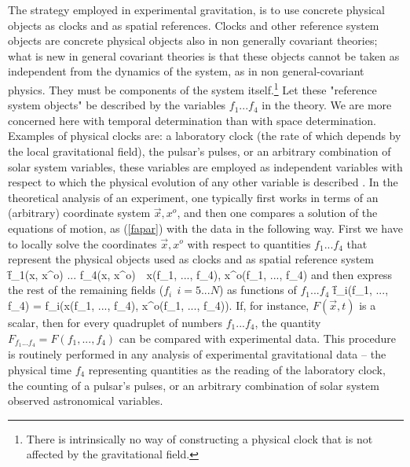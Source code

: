 The strategy employed in experimental gravitation, is to
use concrete physical objects as clocks and as spatial references.
Clocks and other reference system objects are concrete physical
objects also in non generally covariant theories; what is new in
general covariant theories is that these objects cannot be taken
as independent from the dynamics of the system, as in non
general-covariant physics.  They must be components of the
system itself.\footnote{There is intrinsically no way of
constructing a physical clock that is not affected by the
gravitational field.}  Let these "reference system objects" be
described by the variables $f_1... f_4$ in the theory.  We are more
concerned here with temporal determination than with space
determination.  Examples of physical clocks are: a laboratory
clock (the rate of which depends by the local gravitational field),
the pulsar's pulses, or an arbitrary combination of solar system
variables, these variables are employed as independent variables
with respect to which the physical evolution of any other variable
is described  \cite{tradition,observable}.  In the theoretical
analysis of an experiment, one typically first works in terms of
an (arbitrary) coordinate system $\vec x, x^o$, and then one
compares a solution of the equations of motion, as (\ref{fapar})
with the data in the following way.  First we have to locally solve
the coordinates $\vec x, x^o$ with respect to quantities $f_1...
f_4$ that represent the physical objects used as clocks and as
spatial reference system
_1(\vec x, x^o) ... f_4(\vec x, x^o)\  \rightarrow \
	\vec x(f_1, ..., f_4), x^o(f_1, ..., f_4) 	\label{inversion}
\ff
and then  express the rest of the remaining fields ($f_i\ \
i=5...N$) as  functions of $f_1 ... f_4$
_i(f_1, ..., f_4) = f_i(\vec x(f_1, ..., f_4), x^o(f_1, ..., f_4)).
								\label{inversion2}
\ff
If, for instance, $F(\vec x, t)$ is a scalar, then for every
quadruplet of numbers $f_1 ... f_4$, the quantity $F_{f_1...f_4}
=F(f_1, ..., f_4)$ can be compared with experimental data.  This
procedure is routinely performed in any analysis of experimental
gravitational data -- the physical time $f_4$ representing
quantities as the reading of the laboratory clock, the counting of
a pulsar's pulses, or an arbitrary combination of solar system
observed astronomical variables.


